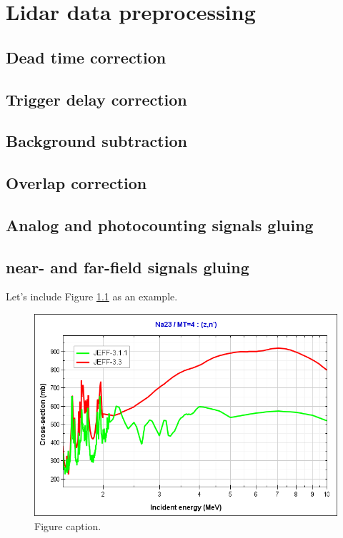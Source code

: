 \chapter{Lidar data preprocessing}
\label{sect:devs02_chapter1}

\section{Dead time correction}
\label{sect::devs02_chapter1_deadtime}

\section{Trigger delay correction}
\label{sect::devs02_chapter1_triggerdelay}

\section{Background subtraction}
\label{sect::devs02_chapter1_triggerdelay}

\section{Overlap correction}
\label{sect::devs02_chapter1_overlap}

\section{Analog and photocounting signals gluing}
\label{sect::devs02_chapter1_gluing_channels}

\section{near- and far-field signals gluing}
\label{sect::devs02_chapter1_gluing_systems}

Let's include Figure \ref{fig::figure01} as an example.

\begin{figure}[h!]
	\begin{center}
		\includegraphics[width=1\textwidth]{TeX_files/Methodology/Figures/na23-mt4-XS-jeff33-jeff311.png}
		\caption{Figure caption.}
		\label{fig::figure01}
	\end{center}
\end{figure}